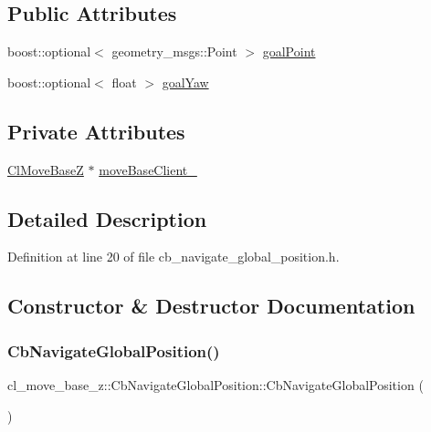 \subsection*{Public Attributes}
\begin{DoxyCompactItemize}
\item 
boost\+::optional$<$ geometry\+\_\+msgs\+::\+Point $>$ \hyperlink{classcl__move__base__z_1_1CbNavigateGlobalPosition_a1960e244a242b2c308fb717617bbbecb}{goal\+Point}
\item 
boost\+::optional$<$ float $>$ \hyperlink{classcl__move__base__z_1_1CbNavigateGlobalPosition_a839900de7f664b27c9be189fadbaa003}{goal\+Yaw}
\end{DoxyCompactItemize}
\subsection*{Private Attributes}
\begin{DoxyCompactItemize}
\item 
\hyperlink{classcl__move__base__z_1_1ClMoveBaseZ}{Cl\+Move\+BaseZ} $\ast$ \hyperlink{classcl__move__base__z_1_1CbNavigateGlobalPosition_a460d6b43834cb52baa94d22cd3a6fd2b}{move\+Base\+Client\+\_\+}
\end{DoxyCompactItemize}


\subsection{Detailed Description}


Definition at line 20 of file cb\+\_\+navigate\+\_\+global\+\_\+position.\+h.



\subsection{Constructor \& Destructor Documentation}
\mbox{\label{classcl__move__base__z_1_1CbNavigateGlobalPosition_aec75d2481b2057bbbdad9513c4dc08cd}} 
\subsubsection{\texorpdfstring{Cb\+Navigate\+Global\+Position()}{CbNavigateGlobalPosition()}\hspace{0.1cm}{\footnotesize\ttfamily [1/2]}}
{\footnotesize\ttfamily cl\+\_\+move\+\_\+base\+\_\+z\+::\+Cb\+Navigate\+Global\+Position\+::\+Cb\+Navigate\+Global\+Position (\begin{DoxyParamCaption}{ }\end{DoxyParamCaption})}



